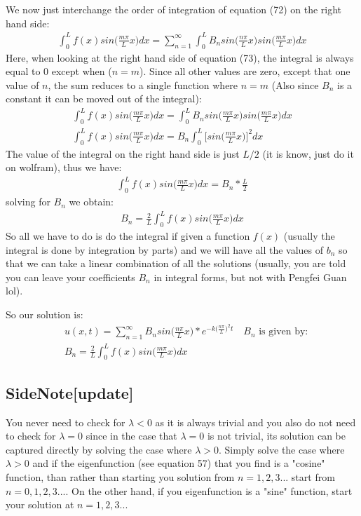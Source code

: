 \documentclass[11pt]{article}
\begin{document}
We now just interchange the order of integration of equation (72) on the right hand side:
\begin{align}
	\int_0^L f(x)sin\bigg(\frac{m\pi}{L} x\bigg)dx = \sum_{n=1}^{\infty} \int_0^L  B_nsin\bigg(\frac{n\pi}{L} x\bigg)sin\bigg(\frac{m\pi}{L} x\bigg)dx
\end{align}
Here, when looking at the right hand side of equation (73), the integral is always equal to 0 except when ($n=m$). Since all other values are zero, except that one value of $n$, the sum reduces to a single function where $n=m$ (Also since $B_n$ is a constant it can be moved out of the integral):
\begin{align}
	\int_0^L f(x)sin\bigg(\frac{m\pi}{L} x\bigg)dx =\int_0^L  B_nsin\bigg(\frac{m\pi}{L} x\bigg)sin\bigg(\frac{m\pi}{L} x\bigg)dx\\
	\int_0^L f(x)sin\bigg(\frac{m\pi}{L} x\bigg)dx =B_n\int_0^L  \bigg[sin\bigg(\frac{m\pi}{L} x\bigg)\bigg]^2dx 
\end{align} 
The value of the integral on the right hand side is just $L/2$ (it is know, just do it on wolfram), thus we have:
\begin{align}
	\int_0^L f(x)sin\bigg(\frac{m\pi}{L} x\bigg)dx =B_n *\frac{L}{2}
\end{align}
solving for $B_n$ we obtain:
\begin{align}
	 B_n= \frac{2}{L}\int_0^L f(x)sin\bigg(\frac{m\pi}{L} x\bigg)dx
\end{align}
So all we have to do is do the integral if given a function $f(x)$ (usually the integral is done by integration by parts) and we will have all the values of $b_n$ so that we can take a linear combination of all the solutions (usually, you are told you can leave your coefficients $B_n$ in integral forms, but not with Pengfei Guan lol).

So our solution is:
\begin{align}
	&u(x,t) = \sum_{n=1}^{\infty} B_nsin\bigg(\frac{n\pi}{L} x\bigg)*e^{-k\big(\frac{n\pi}{L}\big)^2t} \quad \text{$B_n$ is given by:}\\
	 &B_n= \frac{2}{L}\int_0^L f(x)sin\bigg(\frac{m\pi}{L} x\bigg)dx
\end{align}

\subsection{SideNote[update]}
You never need to check for $\lambda<0$ as it is always trivial and you also do not need to check for $\lambda=0$ since in the case that $\lambda=0$ is not trivial, its solution can be captured directly by solving the case where $\lambda>0$. Simply solve the case where $\lambda>0$ and if the eigenfunction (see equation 57) that you find is a "cosine" function, than rather than starting you solution from $n=1,2,3...$ start from $n=0,1,2,3...$. On the other hand, if you eigenfunction is a "sine" function, start your solution at $n=1,2,3...$
\end{document}
